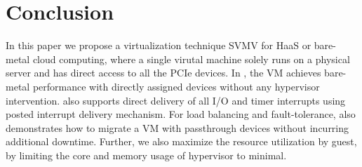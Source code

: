\section{Conclusion}

In this paper we propose a virtualization technique SVMV
for HaaS or bare-metal cloud computing, where a single 
virutal machine solely runs on a physical server and 
has direct access to all the PCIe devices. In \sna, the VM 
achieves bare-metal performance with directly assigned 
devices without any hypervisor 
intervention. \sna also supports direct delivery of all I/O 
and timer interrupts using posted interrupt
delivery mechanism. For load balancing and 
fault-tolerance, \sna also demonstrates how 
to migrate a VM with passthrough devices without incurring 
additional downtime. Further, we also maximize the 
resource utilization by guest, by limiting 
the core and memory usage of hypervisor to minimal.
